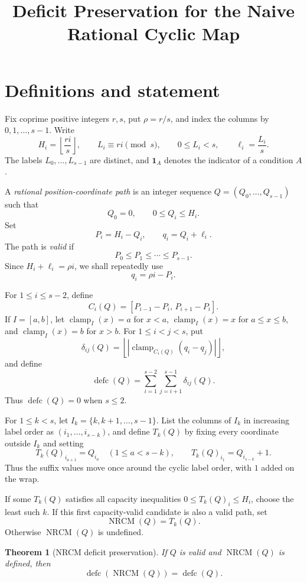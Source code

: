 \documentclass[10pt]{article}
\title{Deficit Preservation for the Naive Rational Cyclic Map}
\author{}
\date{}
\newtheorem{theorem}{Theorem}
\newcommand{\defc}{\operatorname{defc}}
\newcommand{\NRCM}{\operatorname{NRCM}}
\newcommand{\clamp}{\operatorname{clamp}}
\newcommand{\ind}{\mathbf 1}
\begin{document}
\maketitle

\section{Definitions and statement}

Fix coprime positive integers \(r,s\), put \(\rho=r/s\), and index the
columns by \(0,1,\ldots,s-1\).  Write
\[
  H_i=\left\lfloor\frac{ri}{s}\right\rfloor,
  \qquad
  L_i\equiv ri\pmod s,
  \qquad 0\le L_i<s,
  \qquad
  \ell_i=\frac{L_i}{s}.
\]
The labels \(L_0,\ldots,L_{s-1}\) are distinct, and \(\ind_A\) denotes the
indicator of a condition \(A\).

A \emph{rational position-coordinate path} is an integer sequence
\(Q=(Q_0,\ldots,Q_{s-1})\) such that
\[
  Q_0=0,
  \qquad
  0\le Q_i\le H_i.
\]
Set
\[
  P_i=H_i-Q_i,
  \qquad
  q_i=Q_i+\ell_i.
\]
The path is \emph{valid} if
\[
  P_0\le P_1\le\cdots\le P_{s-1}.
\]
Since \(H_i+\ell_i=\rho i\), we shall repeatedly use
\begin{equation}
  q_i=\rho i-P_i.
  \label{eq:q-rho-P}
\end{equation}

For \(1\le i\le s-2\), define
\[
  C_i(Q)=[P_{i-1}-P_i,\,P_{i+1}-P_i].
\]
If \(I=[a,b]\), let \(\clamp_I(x)=a\) for \(x<a\),
\(\clamp_I(x)=x\) for \(a\le x\le b\), and
\(\clamp_I(x)=b\) for \(x>b\).  For \(1\le i<j<s\), put
\[
  \delta_{ij}(Q)
  =\left\lfloor
      \left|\clamp_{C_i(Q)}(q_i-q_j)\right|
    \right\rfloor,
\]
and define
\[
  \defc(Q)=
  \sum_{i=1}^{s-2}\sum_{j=i+1}^{s-1}\delta_{ij}(Q).
\]
Thus \(\defc(Q)=0\) when \(s\le2\).

For \(1\le k<s\), let \(I_k=\{k,k+1,\ldots,s-1\}\).  List the columns of
\(I_k\) in increasing label order as \((i_1,\ldots,i_{s-k})\), and define
\(T_k(Q)\) by fixing every coordinate outside \(I_k\) and setting
\[
  T_k(Q)_{i_{a+1}}=Q_{i_a}\quad(1\le a<s-k),
  \qquad
  T_k(Q)_{i_1}=Q_{i_{s-k}}+1.
\]
Thus the suffix values move once around the cyclic label order, with \(1\)
added on the wrap.

If some \(T_k(Q)\) satisfies all capacity inequalities
\(0\le T_k(Q)_i\le H_i\), choose the least such \(k\).  If this first
capacity-valid candidate is also a valid path, set
\[
  \NRCM(Q)=T_k(Q).
\]
Otherwise \(\NRCM(Q)\) is undefined.

\begin{theorem}[NRCM deficit preservation]
\label{thm:nrcm}
If \(Q\) is valid and \(\NRCM(Q)\) is defined, then
\[
  \defc(\NRCM(Q))=\defc(Q).
\]
\end{theorem}
\end{document}
